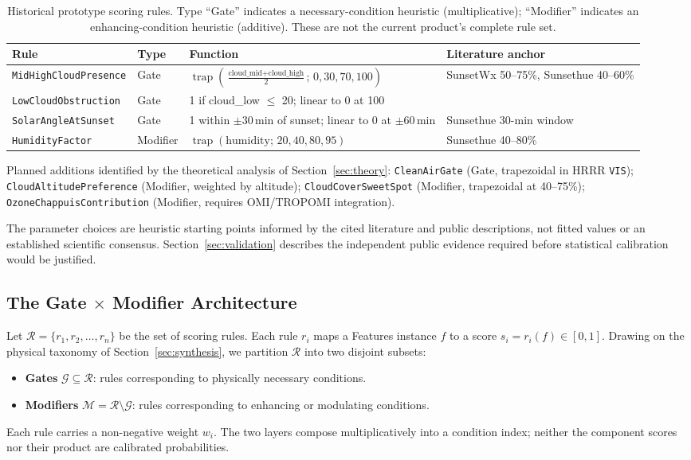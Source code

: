 \documentclass[11pt,a4paper]{article}
\DeclareMathOperator{\trap}{trap}
\begin{document}
\begin{table}[H]
\centering
\small
\begin{tabular}{p{3.0cm}p{1.8cm}p{6.0cm}p{3.5cm}}
\toprule
Rule & Type & Function & Literature anchor \\
\midrule
\texttt{MidHighCloudPresence} & Gate & $\trap\left(\frac{\text{cloud\_mid}+\text{cloud\_high}}{2};\, 0, 30, 70, 100\right)$ & SunsetWx 50--75\%, Sunsethue 40--60\% \\
\texttt{LowCloudObstruction} & Gate & 1 if cloud\_low $\leq$ 20; linear to 0 at 100 & \citet{corfidi2014colors} \\
\texttt{SolarAngleAtSunset} & Gate & 1 within $\pm 30$\,min of sunset; linear to 0 at $\pm 60$\,min & Sunsethue 30-min window \\
\texttt{HumidityFactor} & Modifier & $\trap(\text{humidity};\, 20, 40, 80, 95)$ & Sunsethue 40--80\% \\
\bottomrule
\end{tabular}
\caption{Historical prototype scoring rules. Type ``Gate'' indicates a necessary-condition heuristic (multiplicative); ``Modifier'' indicates an enhancing-condition heuristic (additive). These are not the current product's complete rule set.}
\label{tab:rules}
\end{table}

Planned additions identified by the theoretical analysis of Section~\ref{sec:theory}: \texttt{CleanAirGate} (Gate, trapezoidal in HRRR \texttt{VIS}); \texttt{CloudAltitudePreference} (Modifier, weighted by altitude); \texttt{CloudCoverSweetSpot} (Modifier, trapezoidal at 40--75\%); \texttt{OzoneChappuisContribution} (Modifier, requires OMI/TROPOMI integration).

The parameter choices are heuristic starting points informed by the cited literature and public descriptions, not fitted values or an established scientific consensus. Section~\ref{sec:validation} describes the independent public evidence required before statistical calibration would be justified.

\subsection{The Gate $\times$ Modifier Architecture}
\label{sec:gatemodifier}

Let $\mathcal{R} = \{r_1, r_2, \ldots, r_n\}$ be the set of scoring rules. Each rule $r_i$ maps a Features instance $f$ to a score $s_i = r_i(f) \in [0, 1]$. Drawing on the physical taxonomy of Section~\ref{sec:synthesis}, we partition $\mathcal{R}$ into two disjoint subsets:
\begin{itemize}
\item \textbf{Gates} $\mathcal{G} \subseteq \mathcal{R}$: rules corresponding to physically necessary conditions.
\item \textbf{Modifiers} $\mathcal{M} = \mathcal{R} \setminus \mathcal{G}$: rules corresponding to enhancing or modulating conditions.
\end{itemize}
Each rule carries a non-negative weight $w_i$. The two layers compose multiplicatively into a condition index; neither the component scores nor their product are calibrated probabilities.
\end{document}
